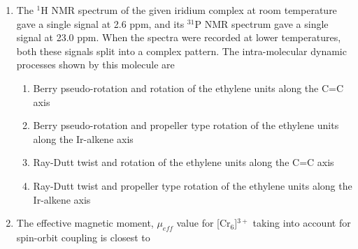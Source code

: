 \documentclass[journal,12pt,onecolumn]{IEEEtran}
\theoremstyle{remark}
\begin{document}
\begin{enumerate}
\item The $^{1}$H NMR spectrum of the given iridium complex at room temperature gave a single signal at 2.6 ppm, and its $^{31}$P NMR spectrum gave a single signal at 23.0 ppm. When the spectra were recorded at lower temperatures, both these signals split into a complex pattern. The intra-molecular dynamic processes shown by this molecule are
    \begin{enumerate}
        \item Berry pseudo-rotation and rotation of the ethylene units along the C=C axis
        \item Berry pseudo-rotation and propeller type rotation of the ethylene units along the Ir-alkene axis
        \item Ray-Dutt twist and rotation of the ethylene units along the C=C axis
        \item Ray-Dutt twist and propeller type rotation of the ethylene units along the Ir-alkene axis
    \end{enumerate}      \hfill{}



\item The effective magnetic moment, $\mu_{eff}$ value for [Cr$_{6}$]$^{3+}$ taking into account for spin-orbit coupling is closest to

    \begin{enumerate}
    \end{enumerate}      \hfill{}


\end{enumerate}
\end{document}
